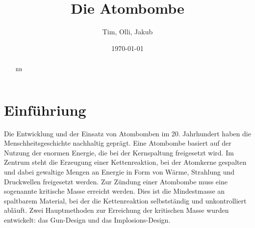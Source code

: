 \documentclass[a4paper,12pt]{article}
\title{Die Atombombe}
\author{Tim, Olli, Jakub}
\date{\today}
\begin{document}
\pagestyle{fancy}

\fancyfoot[LE,RO]{\thepage}

\maketitle

\begin{abstract}
nn
\end{abstract}

\newpage

\tableofcontents

\newpage

\section{Einführiung}
Die Entwicklung und der Einsatz von Atombomben im 20. Jahrhundert haben die Menschheitsgeschichte nachhaltig geprägt. Eine Atombombe basiert auf der Nutzung der enormen Energie, die bei der Kernspaltung freigesetzt wird. Im Zentrum steht die Erzeugung einer Kettenreaktion, bei der Atomkerne gespalten und dabei gewaltige Mengen an Energie in Form von Wärme, Strahlung und Druckwellen freigesetzt werden.
Zur Zündung einer Atombombe muss eine sogenannte kritische Masse erreicht werden. Dies ist die Mindestmasse an spaltbarem Material, bei der die Kettenreaktion selbstständig und unkontrolliert abläuft. Zwei Hauptmethoden zur Erreichung der kritischen Masse wurden entwickelt: das Gun-Design und das Implosions-Design.
\end{document}
